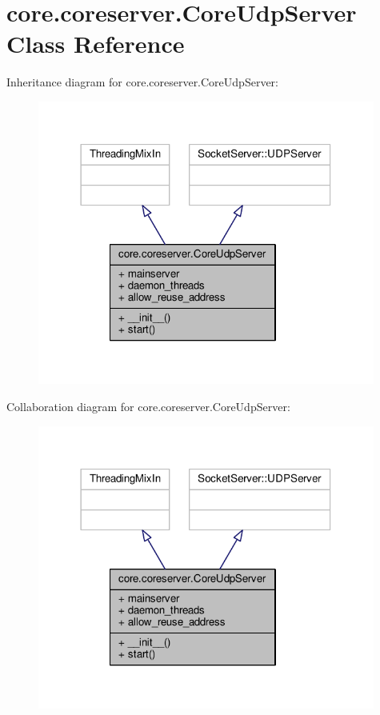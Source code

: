 \hypertarget{classcore_1_1coreserver_1_1_core_udp_server}{\section{core.\+coreserver.\+Core\+Udp\+Server Class Reference}
\label{classcore_1_1coreserver_1_1_core_udp_server}
}


Inheritance diagram for core.\+coreserver.\+Core\+Udp\+Server\+:
\nopagebreak
\begin{figure}[H]
\begin{center}
\leavevmode
\includegraphics[width=314pt]{classcore_1_1coreserver_1_1_core_udp_server__inherit__graph}
\end{center}
\end{figure}


Collaboration diagram for core.\+coreserver.\+Core\+Udp\+Server\+:
\nopagebreak
\begin{figure}[H]
\begin{center}
\leavevmode
\includegraphics[width=314pt]{classcore_1_1coreserver_1_1_core_udp_server__coll__graph}
\end{center}
\end{figure}
